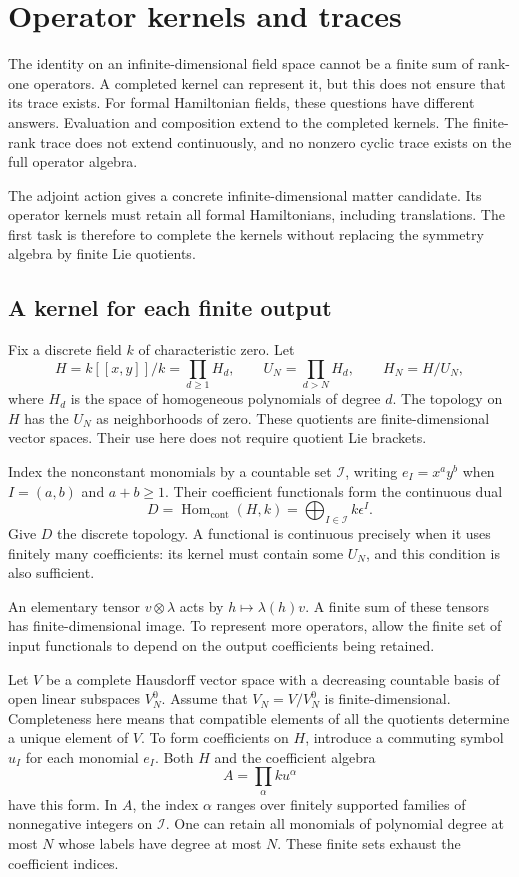 \chapter{Operator kernels and traces}
\label{chap:operator-kernels}

The identity on an infinite-dimensional field space cannot be a finite sum
of rank-one operators. A completed kernel can represent it, but this does
not ensure that its trace exists. For formal Hamiltonian fields, these
questions have different answers. Evaluation and composition extend to
the completed kernels. The finite-rank trace does not extend continuously,
and no nonzero cyclic trace exists on the full operator algebra.

The adjoint action gives a concrete infinite-dimensional matter candidate.
Its operator kernels must retain all formal Hamiltonians, including
translations. The first task is therefore to complete the kernels without
replacing the symmetry algebra by finite Lie quotients.

\section{A kernel for each finite output}

Fix a discrete field $k$ of characteristic zero. Let
\[
 H=k[[x,y]]/k=\prod_{d\geq1}H_d,
 \qquad U_N=\prod_{d>N}H_d,\qquad H_N=H/U_N,
\]
where $H_d$ is the space of homogeneous polynomials of degree $d$.
The topology on $H$ has the $U_N$ as neighborhoods of zero. These
quotients are finite-dimensional vector spaces. Their use here does not
require quotient Lie brackets.

Index the nonconstant monomials by a countable set $\mathcal I$,
writing $e_I=x^ay^b$ when $I=(a,b)$ and $a+b\geq1$.
Their coefficient functionals form the continuous dual
\[
 D=\operatorname{Hom}_{\mathrm{cont}}(H,k)
   =\bigoplus_{I\in\mathcal I}k\epsilon^I.
\]
Give $D$ the discrete topology. A functional is continuous precisely
when it uses finitely many coefficients: its kernel must contain some
$U_N$, and this condition is also sufficient.

An elementary tensor $v\otimes\lambda$ acts by
$h\mapsto\lambda(h)v$. A finite sum of these tensors has finite-dimensional
image. To represent more operators, allow the finite set of input
functionals to depend on the output coefficients being retained.

Let $V$ be a complete Hausdorff vector space with a decreasing countable
basis of open linear subspaces $V_N^0$. Assume that
$V_N=V/V_N^0$ is finite-dimensional. Completeness here means that
compatible elements of all the quotients determine a unique element
of $V$. To form coefficients on $H$, introduce a commuting symbol $u_I$
for each monomial $e_I$. Both $H$ and the coefficient algebra
\[
 A=\prod_\alpha ku^\alpha
\]
have this form. In $A$, the index $\alpha$ ranges over finitely supported
families of nonnegative integers on $\mathcal I$. One can retain all
monomials of polynomial degree at most $N$ whose labels have degree
at most $N$. These finite sets exhaust the coefficient indices.

